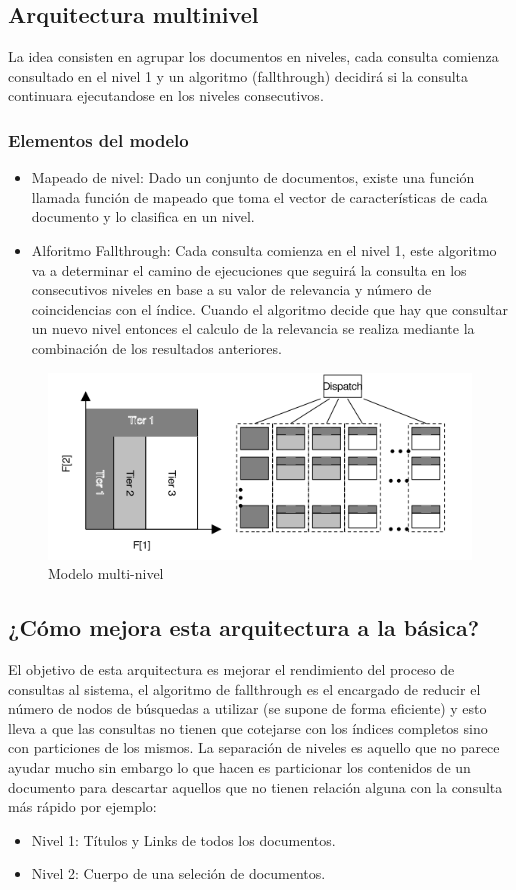\documentclass[a4paper, 11pt]{article} %
\begin{document}
		\subsection{Arquitectura multinivel}
		La idea consisten en agrupar los documentos en niveles, cada consulta comienza consultado en el nivel 1 y un algoritmo (fallthrough) decidirá si la consulta continuara ejecutandose en los niveles consecutivos.
		\subsubsection{Elementos del modelo}
		\begin{itemize}
			\item Mapeado de nivel: Dado un conjunto de documentos, existe una función llamada función de mapeado que toma el vector de características de cada documento y lo clasifica en un nivel.
			\item Alforitmo Fallthrough: Cada consulta comienza en el nivel 1, este algoritmo va a determinar el camino de ejecuciones que seguirá la consulta en los consecutivos niveles en base a su valor de relevancia y número de coincidencias con el índice. Cuando el algoritmo decide que hay que consultar un nuevo nivel entonces el calculo de la relevancia se realiza mediante la combinación de los resultados anteriores.
		\end{itemize}
		\begin{figure}[H]
				\centering
				\includegraphics[scale=0.75]{./img/multitier2.png}
				\caption{Modelo multi-nivel}
				\label{fig:my_label}
		\end{figure}
		\subsection{¿Cómo mejora esta arquitectura a la básica?}
		El objetivo de esta arquitectura es mejorar el rendimiento del proceso de consultas al sistema, el algoritmo de fallthrough es el encargado de reducir el número de nodos de búsquedas a utilizar (se supone de forma eficiente) y esto lleva a que las consultas no tienen que cotejarse con los índices completos sino con particiones de los mismos.
		La separación de niveles es aquello que no parece ayudar mucho sin embargo lo que hacen es particionar los contenidos de un documento para descartar aquellos que no tienen relación alguna con la consulta más rápido por ejemplo:
		\begin{itemize}
			\item Nivel 1: Títulos y Links de todos los documentos.
			\item Nivel 2: Cuerpo de una seleción de documentos.
		\end{itemize}
\end{document}
